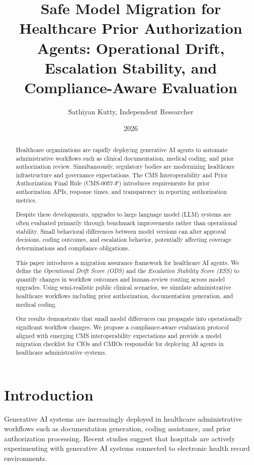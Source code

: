\documentclass[11pt]{article}
\title{
Safe Model Migration for Healthcare Prior Authorization Agents:
Operational Drift, Escalation Stability, and Compliance-Aware Evaluation
}
\author{
Sathiyan Kutty, Independent Researcher
}
\date{2026}
\begin{document}
\maketitle

\begin{abstract}

Healthcare organizations are rapidly deploying generative AI agents to automate administrative workflows such as clinical documentation, medical coding, and prior authorization review. Simultaneously, regulatory bodies are modernizing healthcare infrastructure and governance expectations. The CMS Interoperability and Prior Authorization Final Rule (CMS-0057-F) introduces requirements for prior authorization APIs, response times, and transparency in reporting authorization metrics.

Despite these developments, upgrades to large language model (LLM) systems are often evaluated primarily through benchmark improvements rather than operational stability. Small behavioral differences between model versions can alter approval decisions, coding outcomes, and escalation behavior, potentially affecting coverage determinations and compliance obligations.

This paper introduces a migration assurance framework for healthcare AI agents. We define the \textit{Operational Drift Score (ODS)} and the \textit{Escalation Stability Score (ESS)} to quantify changes in workflow outcomes and human-review routing across model upgrades. Using semi-realistic public clinical scenarios, we simulate administrative healthcare workflows including prior authorization, documentation generation, and medical coding.

Our results demonstrate that small model differences can propagate into operationally significant workflow changes. We propose a compliance-aware evaluation protocol aligned with emerging CMS interoperability expectations and provide a model migration checklist for CIOs and CMIOs responsible for deploying AI agents in healthcare administrative systems.

\end{abstract}

\section{Introduction}

Generative AI systems are increasingly deployed in healthcare administrative workflows such as documentation generation, coding assistance, and prior authorization processing. Recent studies suggest that hospitals are actively experimenting with generative AI systems connected to electronic health record environments.
\end{document}
